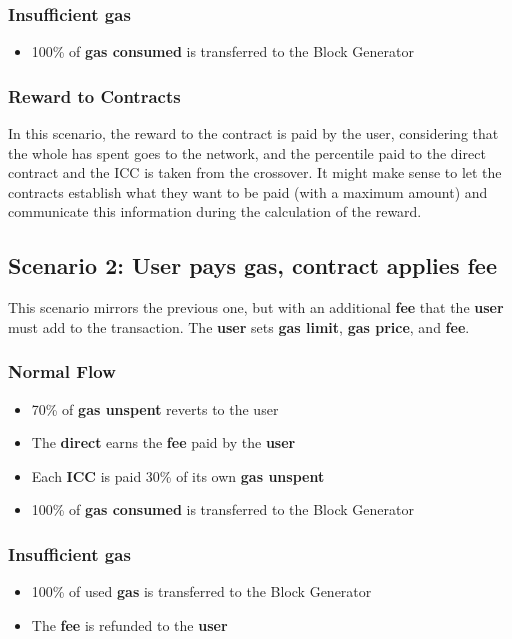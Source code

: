 \documentclass[twocolumn, nofootinbib]{revtex4-2}
\begin{document}
    \subsubsection{Insufficient gas}\label{subsubsec:insufficient-gas-1}
    \begin{itemize}
        \item 100\% of \textbf{gas consumed} is transferred to the Block Generator
    \end{itemize}

    \subsubsection{Reward to Contracts}\label{subsubsec:reward-to-contract-1}
    In this scenario, the reward to the contract is paid by the user,
    considering that the whole has spent goes to the network, and the
    percentile paid to the direct contract and the ICC is taken from the
    crossover.
    It might make sense to let the contracts establish what they want to be
    paid (with a maximum amount) and communicate this information during the
    calculation of the reward.

    \subsection{Scenario 2: User pays gas, contract applies fee}\label{subsec:scenario-2}
    This scenario mirrors the previous one, but with an additional \textbf{fee}
    that the \textbf{user} must add to the transaction.
    The \textbf{user} sets \textbf{gas limit}, \textbf{gas price}, and \textbf{fee}.

    \subsubsection{Normal Flow}\label{subsubsec:normal-flow-2}
    \begin{itemize}
        \item 70\% of \textbf{gas unspent} reverts to the user
        \item The \textbf{direct} earns the \textbf{fee} paid by the \textbf{user}
        \item Each \textbf{ICC} is paid 30\% of its own \textbf{gas unspent}
        \item 100\% of \textbf{gas consumed} is transferred to the Block Generator
    \end{itemize}

    \subsubsection{Insufficient gas}\label{subsubsec:insufficient-gas-2}
    \begin{itemize}
        \item 100\% of used \textbf{gas} is transferred to the Block Generator
        \item The \textbf{fee} is refunded to the \textbf{user}
    \end{itemize}
\end{document}
